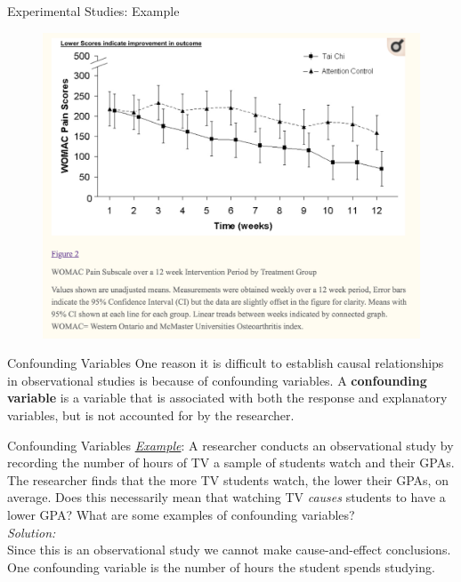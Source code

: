 \documentclass[10pt]{beamer}
\begin{document}
\begin{frame}{Experimental Studies: Example}
\begin{figure}
\includegraphics[scale=0.3]{figure/Pain12weeks.png}
\end{figure}
\end{frame}

\begin{frame}{Confounding Variables}
One reason it is difficult to establish causal relationships in observational studies is because of confounding variables. A \textbf{confounding variable} is a variable that is associated with both the response and explanatory variables, but is not accounted for by the researcher.
\end{frame}

\begin{frame}{Confounding Variables}
\vspace{-1.5cm} 
\emph{\underline{Example}}:  A researcher conducts an observational study by recording the number of hours of TV a sample of students watch and their GPAs.  The researcher finds that the more TV students watch, the lower their GPAs, on average.  Does this necessarily mean that watching TV \emph{causes} students to have a lower GPA?  What are some examples of confounding variables?\\
\vspace{10pt}
{\color{blue} \emph{Solution:}\\
Since this is an observational study we cannot make cause-and-effect conclusions.  One confounding variable is the number of hours the student spends studying.}
\end{frame}
\end{document}
